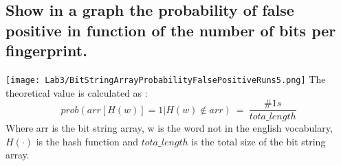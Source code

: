 \documentclass{report}
\begin{document}
{			\subsection{Show in a graph the probability of false positive in function of the number of bits per fingerprint.}
			\texttt{[image: Lab3/BitStringArrayProbabilityFalsePositiveRuns5.png]}
			The theoretical value is calculated as :
			\begin{equation}\label{eq:4}
				prob(arr[H(w)]=1|H(w) \not\in arr) \: = \: \frac{\#1s}{tota\_length} 
			\end{equation}
			Where arr is the bit string array, w is the word not in the english vocabulary, $H(\cdot)$ is the hash function and $tota\_length$ is the total size of the bit string array.
			
			
			
}
\end{document}
